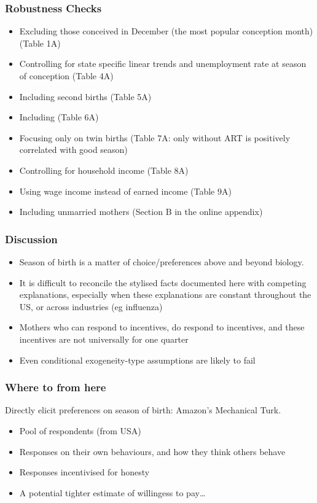 \documentclass[10pt,letterpaper,subeqn]{beamer}
\begin{document}
\begin{frame}
\hypertarget{robustness}{}
\frametitle{Robustness Checks}
\begin{itemize}
\item Excluding those conceived in December (the most popular conception month) (Table 1A)
\item Controlling for state specific linear trends and unemployment rate at season of conception (Table 4A)
\item Including second births (Table 5A)
\item Including \hyperlink{twins}{} (Table 6A)
\item Focusing only on twin births (Table 7A: only without ART is positively correlated with good season)
\item Controlling for household income (Table 8A)
\item Using wage income instead of earned income (Table 9A)
\item Including unmarried mothers (Section B in the online appendix)
\end{itemize}
\end{frame}

\begin{frame}
\frametitle{Discussion}
\begin{itemize}
\item Season of birth is a matter of choice/preferences above and beyond biology.
\item It is difficult to reconcile the stylised facts documented here with competing explanations, especially when these explanations are constant throughout the US, or across industries (eg influenza)
\item Mothers who can respond to incentives, do respond to incentives, and these incentives are not universally for one quarter
\item Even conditional exogeneity-type assumptions are likely to fail
\end{itemize}
\end{frame}


\begin{frame}
\frametitle{Where to from here}
Directly elicit preferences on season of birth: Amazon's Mechanical Turk.
\begin{itemize}
\item Pool of respondents (from USA)
\item Responses on their own behaviours, and how they think others behave
\item Responses incentivised for honesty
\item A potential tighter estimate of willingess to pay\ldots
\end{itemize}
\end{frame}
\end{document}
